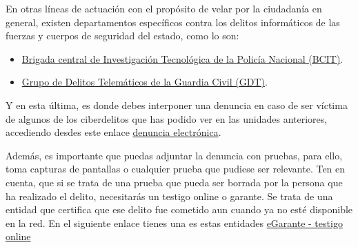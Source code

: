 \documentclass[
  a4paper,
  openany]{book}
\begin{document}
En otras líneas de actuación con el propósito de velar por la ciudadanía en general, existen departamentos específicos contra los delitos informáticos de las fuerzas y cuerpos de seguridad del estado, como lo son:

\begin{itemize}
\item
  \href{https://www.policia.es/_es/tupolicia_conocenos_estructura_dao_cgpoliciajudicial_bcit.php}{Brigada central de Investigación Tecnológica de la Policía Nacional (BCIT)}.
\item
  \href{https://www.gdt.guardiacivil.es/webgdt/home_alerta.php}{Grupo de Delitos Telemáticos de la Guardia Civil (GDT)}.
\end{itemize}

Y en esta última, es donde debes interponer una denuncia en caso de ser víctima de algunos de los ciberdelitos que has podido ver en las unidades anteriores, accediendo desdes este enlace \href{https://www.guardiacivil.es/es/servicios/denuncias/denuncia_electronica/index.html}{denuncia electrónica}.

Además, es importante que puedas adjuntar la denuncia con pruebas, para ello, toma capturas de pantallas o cualquier prueba que pudiese ser relevante. Ten en cuenta, que si se trata de una prueba que pueda ser borrada por la persona que ha realizado el delito, necesitarás un testigo online o garante. Se trata de una entidad que certifica que ese delito fue cometido aun cuando ya no esté disponible en la red. En el siguiente enlace tienes una es estas entidades \href{https://www.egarante.com/}{eGarante - testigo online}

  
\end{document}
